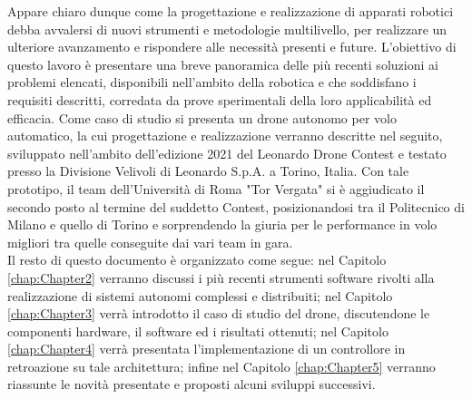 Appare chiaro dunque come la progettazione e realizzazione di apparati robotici debba avvalersi di nuovi strumenti e metodologie multilivello, per realizzare un ulteriore avanzamento e rispondere alle necessità presenti e future.\newpage
L'obiettivo di questo lavoro è presentare una breve panoramica delle più recenti soluzioni ai problemi elencati, disponibili nell'ambito della robotica e che soddisfano i requisiti descritti, corredata da prove sperimentali della loro applicabilità ed efficacia. Come caso di studio si presenta un drone autonomo per volo automatico, la cui progettazione e realizzazione verranno descritte nel seguito, sviluppato nell'ambito dell'edizione 2021 del Leonardo Drone Contest e testato presso la Divisione Velivoli di Leonardo S.p.A. a Torino, Italia. Con tale prototipo, il team dell'Università di Roma "Tor Vergata" si è aggiudicato il secondo posto al termine del suddetto Contest, posizionandosi tra il Politecnico di Milano e quello di Torino e sorprendendo la giuria per le performance in volo migliori tra quelle conseguite dai vari team in gara.\\
Il resto di questo documento è organizzato come segue: nel Capitolo \ref{chap:Chapter2} verranno discussi i più recenti strumenti software rivolti alla realizzazione di sistemi autonomi complessi e distribuiti; nel Capitolo \ref{chap:Chapter3} verrà introdotto il caso di studio del drone, discutendone le componenti hardware, il software ed i risultati ottenuti; nel Capitolo \ref{chap:Chapter4} verrà presentata l'implementazione di un controllore in retroazione su tale architettura; infine nel Capitolo \ref{chap:Chapter5} verranno riassunte le novità presentate e proposti alcuni sviluppi successivi.
